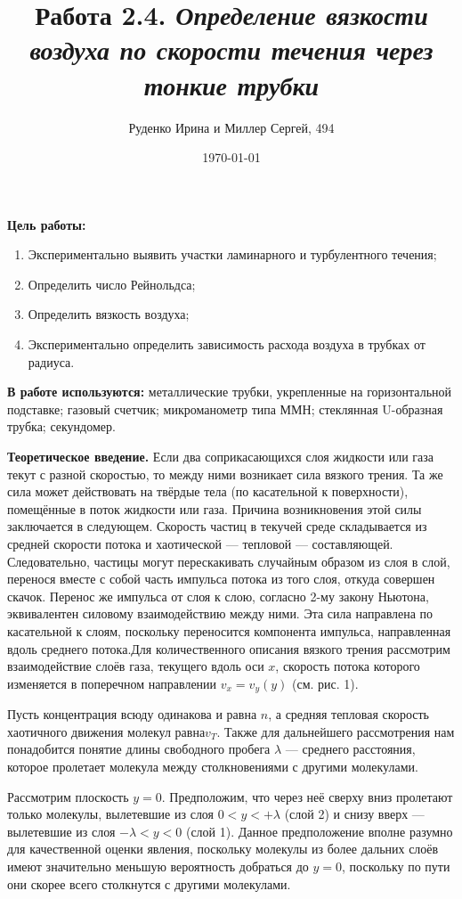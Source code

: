 \documentclass{article}
\title{Работа 2.4. {\it Определение вязкости воздуха
по скорости течения через тонкие трубки}}
\author{Руденко Ирина и Миллер Сергей, 494}
\date{\today}
\begin{document}
\maketitle
\textbf{Цель работы:}
    \begin{enumerate}
    \item Экспериментально выявить участки ламинарного и турбулентного течения; 
    \item Определить число Рейнольдса; 
    \item Определить вязкость воздуха; 
    \item Экспериментально определить зависимость расхода воздуха в трубках от радиуса.
    \end{enumerate}
\textbf{В работе используются:} металлические трубки, укрепленные на горизонтальной подставке; газовый счетчик; микроманометр типа ММН; стеклянная U-образная трубка; секундомер.

\textbf{Теоретическое введение.}
Если два соприкасающихся слоя жидкости или газа текут с разной скоростью, то между ними возникает сила вязкого трения. Та же сила может действовать на твёрдые тела (по касательной к поверхности), помещённые в поток жидкости или газа. Причина возникновения этой силы заключается в следующем. Скорость частиц в текучей среде складывается из средней скорости потока и хаотической  — тепловой — составляющей. Следовательно, частицы могут перескакивать случайным образом из слоя в слой, перенося вместе с собой часть импульса потока из того слоя, откуда совершен скачок. Перенос же импульса от слоя к слою, согласно 2-му закону Ньютона, эквивалентен силовому взаимодействию между ними. Эта сила направлена по касательной к слоям, поскольку переносится компонента импульса, направленная вдоль среднего потока.Для количественного описания вязкого трения рассмотрим взаимодействие слоёв газа, текущего вдоль оси $x$, скорость потока которого изменяется в поперечном направлении $v_x = v_y(y)$ (см. рис. 1).

Пусть концентрация всюду одинакова и равна $n$, а средняя тепловая скорость хаотичного движения молекул равна$v_T$. Также для дальнейшего рассмотрения нам понадобится понятие длины свободного пробега $\lambda$
— среднего расстояния, которое пролетает молекула между столкновениями с другими молекулами.

Рассмотрим плоскость $y = 0$. Предположим, что через неё сверху вниз пролетают только молекулы, вылетевшие из слоя $0 < y < +\lambda$ (слой 2) и снизу вверх — вылетевшие из слоя $-\lambda < y < 0$ (слой 1). Данное предположение вполне разумно для качественной оценки явления, поскольку молекулы из более дальних слоёв имеют значительно меньшую вероятность добраться до $ y = 0$, поскольку по пути они скорее всего столкнутся с другими молекулами.
\end{document}
